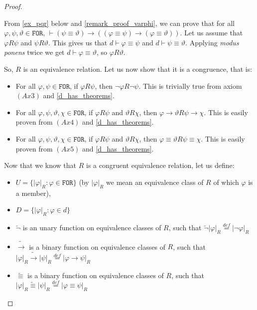 \documentclass{article}
\theoremstyle{definition}
\theoremstyle{definition}
\theoremstyle{definition}
\newcommand*{\id}{\equiv}
\newcommand*{\ra}{\rightarrow}
\newcommand*{\FOR}{\texttt{FOR}}
\begin{document}
\begin{proof}
\begin{itemize}[]
              From \cref{ex_pqr} below and \cref{remark_proof_varphi}, we can prove that for
              all $\varphi, \psi, \vartheta \in \FOR$, $\vdash (\psi \id \vartheta) \ra
                  ((\varphi \id \psi) \ra (\varphi \id \vartheta))$. Let us assume that $\varphi
                  R \psi$ and $\psi R \vartheta$. This gives us that $d \vdash \varphi \id \psi$
              and $d \vdash \psi \id \vartheta$. Applying \emph{modus ponens} twice we get $d
                  \vdash \varphi \id \vartheta$, so $\varphi R \vartheta$.
    \end{itemize}
    So, $R$ is an equivalence relation. Let us now show that it is a congruence,
    that is:
    \begin{itemize}[]
        \item For all $\varphi, \psi \in \FOR$, if $\varphi R \psi$, then $\lnot \varphi R
                  \lnot \psi$. This is trivially true from axiom $(Ax3)$ and \cref{d_has_theorems}.
        \item For all $\varphi, \psi, \vartheta, \chi \in \FOR$, if $\varphi R \psi$ and
              $\vartheta R \chi$, then $\varphi \ra \vartheta R \psi \ra \chi$. This is
              easily proven from $(Ax4)$ and \cref{d_has_theorems}.
        \item For all $\varphi, \psi, \vartheta, \chi \in \FOR$, if $\varphi R \psi$ and
              $\vartheta R \chi$, then $\varphi \id \vartheta R \psi \id \chi$. This is
              easily proven from $(Ax5)$ and \cref{d_has_theorems}.
    \end{itemize}
    Now that we know that $R$ is a congruent equivalence relation, let us define:
    \begin{itemize}
        \item $U = \{ |\varphi|_R : \varphi \in \FOR \}$ (by $|\varphi|_R$ we mean an equivalence class of $R$ of which $\varphi$ is a member),
        \item $D = \{ |\varphi|_R : \varphi \in d\}$
        \item $\tilde{\lnot}$ is an unary function on equivalence classes of $R$, such that $\tilde{\lnot}|\varphi|_R \stackrel{def}{=} |\lnot \varphi|_R$
        \item $\tilde{\ra}$ is a binary function on equivalence classes of $R$, such that $|\varphi|_R \tilde{\ra} |\psi|_R \stackrel{def}{=} |\varphi \ra \psi|_R$
        \item $\tilde{\id}$ is a binary function on equivalence classes of $R$, such that $|\varphi|_R \tilde{\id} |\psi|_R \stackrel{def}{=} |\varphi \id \psi|_R$

\end{itemize}
\end{proof}
\end{document}
